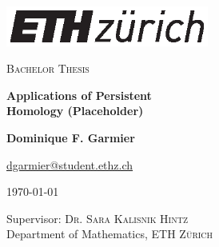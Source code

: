 \begin{titlepage}
\begin{center}
\vspace{1cm}
\includegraphics[width=0.5\textwidth]{assets/logo.eps}\\
\vspace{1cm}


\textsc{Bachelor Thesis}

\vspace{1cm}

{\huge \textbf{Applications of Persistent \\[0.5em] Homology (Placeholder)}}

\vspace{1cm}
\textbf{Dominique F. Garmier}
       
\vspace{0.15cm}
       
\href{mailto:dgarmier@student.ethz.ch}{dgarmier@student.ethz.ch}

\vspace{0.25cm}

\today

\vfill
            
\vspace{0.8cm}
     
Supervisor: \textsc{Dr. Sara Kalisnik Hintz}\\
Department of Mathematics, \textsc{ETH Zürich}\\
       
\end{center}
\end{titlepage}